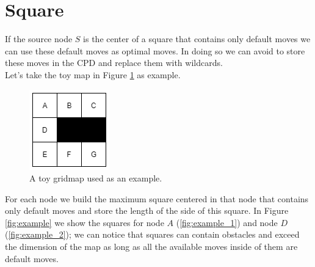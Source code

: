 \section{Square}
\label{sec:square}
If the source node $S$ is the center of a square that contains only default moves we can use these default moves as optimal moves. In doing so we can avoid to store these moves in the CPD and replace them with wildcards.\\ 
Let's take the toy map in Figure \ref{fig:toy_map} as example.\\
\begin{figure}[h]
	\centering
	\includegraphics[width=0.3\columnwidth]{toy_map.png}
	\caption{A toy gridmap used as an example.}
	\label{fig:toy_map}
\end{figure}

For each node we build the maximum square centered in that node that contains only default moves and store the length of the side of this square. In Figure \ref{fig:example} we show the squares for node $A$ (\ref{fig:example_1}) and node $D$ (\ref{fig:example_2}); we can notice that squares can contain obstacles and exceed the dimension of the map as long as all the available moves inside of them are default moves. 

